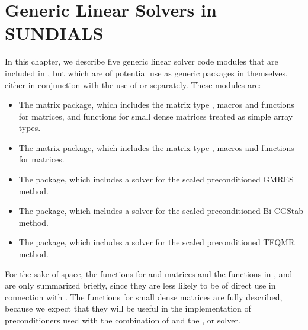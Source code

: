 \chapter{Generic Linear Solvers in SUNDIALS}\label{s:gen_linsolv}
In this chapter, we describe five generic linear solver code modules that 
are included in {\cvodes}, but which are of potential use as generic packages in
themselves, either in conjunction with the use of {\cvodes} or separately.
These modules are:
\begin{itemize}
\item The {\dense} matrix package, which includes the matrix type ,
      macros and functions for  matrices, and functions
      for small dense matrices treated as simple array types.
\item The {\band} matrix package, which includes the matrix type ,
      macros and functions for  matrices.
\item The {\spgmr} package, which includes a solver for the scaled
      preconditioned GMRES method.
\item The {\spbcg} package, which includes a solver for the scaled
      preconditioned Bi-CGStab method.
\item The {\sptfqmr} package, which includes a solver for the scaled
      preconditioned TFQMR method.
\end{itemize}

For the sake of space, the functions for  and
 matrices and the functions in {\spgmr}, {\spbcg} and {\sptfqmr}
are only summarized briefly, since they are less likely to be of direct use
in connection with {\cvodes}.  The functions for small dense matrices are fully
described, because we expect that they will be useful in the
implementation of preconditioners used with the combination of {\cvodes}
and the {\cvspgmr}, {\cvspbcg} or {\cvsptfqmr} solver.







